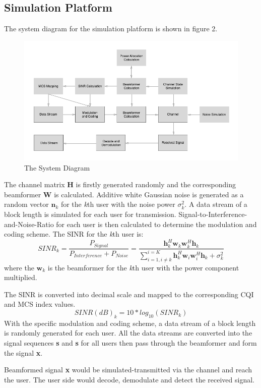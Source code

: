 \documentclass{article}
\begin{document}
\subsection{Simulation Platform}
The system diagram for the simulation platform is shown in figure 2.
\begin{figure}[ht]
\centering
\includegraphics[scale=0.5]{SystemDia.png}
\caption{The System Diagram}
\label{fig:SystemDia}
\end{figure}

\noindent
The channel matrix \textbf{H} is firstly generated randomly and the corresponding beamformer \textbf{W} is calculated.
Additive white Gaussian noise is generated as a random vector $\textbf{n}_k$ for the \textit{k}th user with the noise power $\sigma^2_k$.
A data stream of a block length is simulated for each user for transmission.
Signal-to-Interference-and-Noise-Ratio for each user is then calculated to determine the modulation and coding scheme.
The SINR for the \textit{k}th user is:
\[
SINR_k = \frac{P_{Signal}}{P_{Interference}+P_{Noise}} = \frac{\textbf{h}_k^H\textbf{w}_k\textbf{w}_k^H\textbf{h}_k}{\sum_{i = 1,i\neq k}^{i = K}\textbf{h}_k^H\textbf{w}_i\textbf{w}_i^H\textbf{h}_k+\sigma_k^2}
\]
where the $\textbf{w}_k$ is the beamformer for the \textit{k}th user with the power component multiplied.

\noindent
The SINR is converted into decimal scale and mapped to the corresponding CQI and MCS index values.
$$SINR(dB)_k = 10*log_{10}(SINR_k)$$
With the specific modulation and coding scheme, a data stream of a block length is randomly generated for each user.
All the data streams are converted into the signal sequences \textbf{s}
and \textbf{s} for all users then pass through the beamformer and form the signal \textbf{x}.

\noindent
Beamformed signal \textbf{x} would be simulated-transmitted via the channel and reach the user.
The user side would decode, demodulate and detect the received signal.
\end{document}
